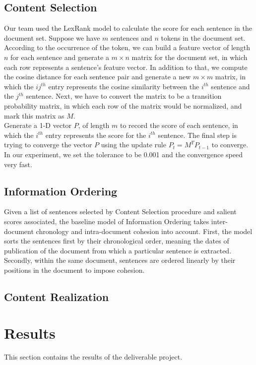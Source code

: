 \documentclass[11pt]{article}
\begin{document}
\subsection{Content Selection}

Our team used the LexRank model to calculate the score for each sentence in the document set. Suppose we have $m$ sentences and $n$ tokens in the document set. According to the occurrence of the token, we can build a feature vector of length $n$ for each sentence and generate a $m\times n$ matrix for the document set, in which each row represents a sentence's feature vector. In addition to that, we compute the cosine distance for each sentence pair and generate a new $m\times m$ matrix, in which the $ij^{th}$ entry represents the cosine similarity between the $i^{th}$ sentence and the $j^{th}$ sentence. Next, we have to convert the matrix to be a transition probability matrix, in which each row of the matrix would be normalized, and mark this matrix as $M$. \\
\indent
Generate a 1-D vector $P$,  of length $m$ to record the score of each sentence, in which the $i^{th}$ entry represents the score for the $i^{th}$ sentence. The final step is trying to converge the vector $P$ using the update rule $P_t = M^T P_{t-1}$ to converge. In our experiment, we set the tolerance to be 0.001 and the convergence speed very fast.

\subsection{Information Ordering}
Given a list of sentences selected by Content Selection procedure and salient scores associated, the baseline model of Information Ordering takes inter-document chronology and intra-document cohesion into account. First, the model sorts the sentences first by their chronological order, meaning the dates of publication of the document from which a particular sentence is extracted. Secondly, within the same document, sentences are ordered linearly by their positions in the document to impose cohesion. 

\subsection{Content Realization}
\section{Results}

This section contains the results of the deliverable project.
\end{document}

